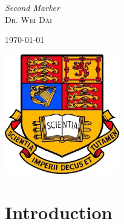 \documentclass[11pt]{article}
\begin{document}
\begin{titlepage}
	\vfill
	
	{\large\textit{Second Marker}}\\
	\textsc{Dr. Wei Dai} 
	\vfill\vfill\vfill %
	
	{\large\today} %
	
	
	\vfill\vfill
	 
	\includegraphics[width=5cm]{imperialcollegelondon.jpg}\\[1cm] %
	
	\vfill %
	
\end{titlepage}

\begin{titlepage}
\tableofcontents
\end{titlepage}

\section{Introduction}
\end{document}
